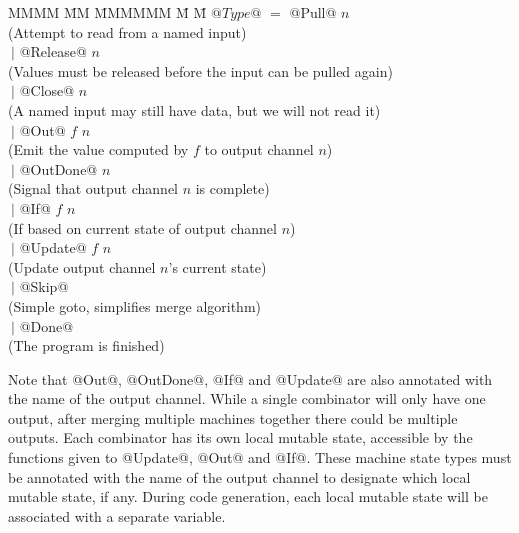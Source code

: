 \begin{tabbing}
MMMM \= MM \= MMMMMM \= M \= M \kill
$@Type@$ \> $=$ \> @Pull@     \>     \> $n$         \\
         \>     \> (Attempt to read from a named input) \\

         \> $~|$\> @Release@  \>     \> $n$         \\
         \>     \> (Values must be released before the input can be pulled again) \\

         \> $~|$\> @Close@    \>     \> $n$         \\
         \>     \> (A named input may still have data, but we will not read it) \\

         \> $~|$\> @Out@      \> $f$ \> $n$         \\
         \>     \> (Emit the value computed by $f$ to output channel $n$) \\

         \> $~|$\> @OutDone@  \>     \> $n$         \\
         \>     \> (Signal that output channel $n$ is complete) \\

         \> $~|$\> @If@       \> $f$ \> $n$         \\
         \>     \> (If based on current state of output channel $n$) \\

         \> $~|$\> @Update@   \> $f$ \> $n$         \\
         \>     \> (Update output channel $n$'s current state) \\

         \> $~|$\> @Skip@     \>                    \\
         \>     \> (Simple goto, simplifies merge algorithm) \\

         \> $~|$\> @Done@     \>                    \\
         \>     \> (The program is finished) \\
\end{tabbing}

Note that @Out@, @OutDone@, @If@ and @Update@ are also annotated with the name of the output channel.
While a single combinator will only have one output, after merging multiple machines together there could be multiple outputs.
Each combinator has its own local mutable state, accessible by the functions given to @Update@, @Out@ and @If@.
These machine state types must be annotated with the name of the output channel to designate which local mutable state, if any.
During code generation, each local mutable state will be associated with a separate variable.

